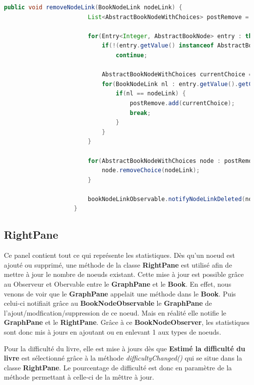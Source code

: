 				\begin{lstlisting}[gobble=12, language=java, caption=Classe NodeLinkFxListener avec le mode DELETE]
					public void removeNodeLink(BookNodeLink nodeLink) {
						List<AbstractBookNodeWithChoices> postRemove = new ArrayList<>();

						for(Entry<Integer, AbstractBookNode> entry : this.nodes.entrySet()) {
							if(!(entry.getValue() instanceof AbstractBookNodeWithChoices))
								continue;

							AbstractBookNodeWithChoices currentChoice = (AbstractBookNodeWithChoices) entry.getValue();
							for(BookNodeLink nl : entry.getValue().getChoices()) {
								if(nl == nodeLink) {
									postRemove.add(currentChoice);
									break;
								}
							}
						}

						for(AbstractBookNodeWithChoices node : postRemove) {
							node.removeChoice(nodeLink);
						}

						bookNodeLinkObservable.notifyNodeLinkDeleted(nodeLink);
					}
				\end{lstlisting}



		\subsection{RightPane}

		Ce panel contient tout ce qui représente les statistiques. Dès qu'un noeud est ajouté ou supprimé, une méthode de la classe \textbf{RightPane} est utilisé afin de mettre à jour le nombre de noeuds existant. Cette mise à jour est possible grâce au Observeur et Obervable entre le \textbf{GraphPane} et le \textbf{Book}. En effet, nous venons de voir que le \textbf{GraphPane} appelait une méthode dans le \textbf{Book}. Puis celui-ci notifiait grâce au \textbf{BookNodeObservable} le \textbf{GraphPane} de l'ajout/modfication/suppression de ce noeud. Mais en réalité elle notifie le \textbf{GraphPane} et le \textbf{RightPane}. Grâce à ce \textbf{BookNodeObserver}, les statistiques sont donc mis à jours en ajoutant ou en enlevant 1 aux types de noeuds.

		Pour la difficulté du livre, elle est mise à jours dès que \textbf{Estimé la difficulté du livre} est sélectionné grâce à la méthode \textit{difficultyChanged()} qui se situe dans la classe \textbf{RightPane}. Le pourcentage de difficulté est donc en paramètre de la méthode permettant à celle-ci de la mêttre à jour.\\

